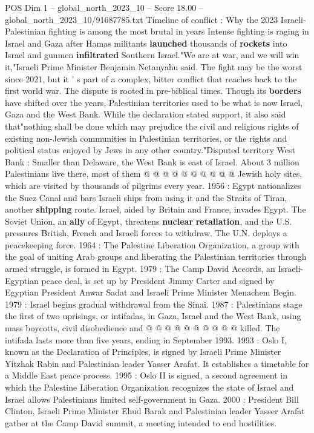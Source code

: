 \begin{textsample}{POS Dim 1 – global\_north\_2023\_10 – Score 18.00 – global\_north\_2023\_10/91687785.txt}  \label{ex:f1_pos_145}
Timeline of conflict : Why the 2023 Israeli-Palestinian fighting is among the most brutal in years Intense fighting is raging in Israel and Gaza after Hamas militants \textbf{launched} thousands of \textbf{rockets} into Israel and gunmen \textbf{infiltrated} Southern Israel."We are at war, and we will win it,"Israeli Prime Minister Benjamin Netanyahu said.
The fight may be the worst since 2021, but it ' s part of a complex, bitter conflict that reaches back to the first world war.
The dispute is rooted in pre-biblical times.
Though its \textbf{borders} have shifted over the years, Palestinian territories used to be what is now Israel, Gaza and the West Bank.
While the declaration stated support, it also said that"nothing shall be done which may prejudice the civil and religious rights of existing non-Jewish communities in Palestinian territories, or the rights and political status enjoyed by Jews in any other country."Disputed territory West Bank : Smaller than Delaware, the West Bank is east of Israel.
About 3 million Palestinians live there, most of them @ @ @ @ @ @ @ @ @ @ Jewish holy sites, which are visited by thousands of pilgrims every year. 1956 : Egypt nationalizes the Suez Canal and bars Israeli ships from using it and the Straits of Tiran, another \textbf{shipping} route.
Israel, aided by Britain and France, invades Egypt.
The Soviet Union, an \textbf{ally} of Egypt, threatens \textbf{nuclear} \textbf{retaliation}, and the U.S. pressures British, French and Israeli forces to withdraw.
The U.N. deploys a peacekeeping force. 1964 : The Palestine Liberation Organization, a group with the goal of uniting Arab groups and liberating the Palestinian territories through armed struggle, is formed in Egypt. 1979 : The Camp David Accords, an Israeli-Egyptian peace deal, is set up by President Jimmy Carter and signed by Egyptian President Anwar Sadat and Israeli Prime Minister Menachem Begin. 1979 : Israel begins gradual withdrawal from the Sinai. 1987 : Palestinians stage the first of two uprisings, or intifadas, in Gaza, Israel and the West Bank, using mass boycotts, civil disobedience and @ @ @ @ @ @ @ @ @ @ killed.
The intifada lasts more than five years, ending in September 1993. 1993 : Oslo I, known as the Declaration of Principles, is signed by Israeli Prime Minister Yitzhak Rabin and Palestinian leader Yasser Arafat.
It establishes a timetable for a Middle East peace process. 1995 : Oslo II is signed, a second agreement in which the Palestine Liberation Organization recognizes the state of Israel and Israel allows Palestinians limited self-government in Gaza. 2000 : President Bill Clinton, Israeli Prime Minister Ehud Barak and Palestinian leader Yasser Arafat gather at the Camp David summit, a meeting intended to end hostilities.

\end{textsample}
